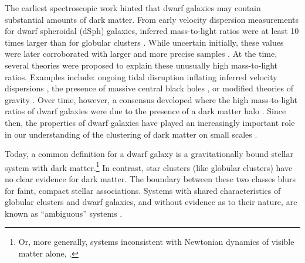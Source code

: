 The earliest spectroscopic work hinted that dwarf galaxies may contain
substantial amounts of dark matter. From early velocity dispersion
measurements for dwarf spheroidal (dSph) galaxies, inferred
mass-to-light ratios were at least 10 times larger than for globular
clusters \citep[e.g.,][]{aaronson1983, aaronson+olszewski1987}. While
uncertain initially, these values were later corroborated with larger
and more precise samples \citep[e.g.,][]{hargreaves+1994}. At the time,
several theories were proposed to explain these unusually high
mass-to-light ratios. Examples include: ongoing tidal disruption
inflating inferred velocity dispersions
\citep[e.g.,][]{kuhn+miller1989}, the presence of massive central black
holes \citep[e.g.,][]{strobel+lake1994}, or modified theories of gravity
\citep{milgrom1995}. Over time, however, a consensus developed where the
high mass-to-light ratios of dwarf galaxies were due to the presence of
a dark matter halo \citep[e.g.,][]{dekel+silk1986, wechsler+tinker2018}.
Since then, the properties of dwarf galaxies have played an increasingly
important role in our understanding of the clustering of dark matter on
small scales \citep[e.g.,][]{bullock+boylan-kolchin2017, sales+2022}.

Today, a common definition for a dwarf galaxy is a gravitationally bound
stellar system with dark matter.\footnote{Or, more generally, systems
  inconsistent with Newtonian dynamics of visible matter alone,
  \citet{willman+strader2012}.} In contrast, star clusters (like
globular clusters) have no clear evidence for dark matter. The boundary
between these two classes blurs for faint, compact stellar associations.
Systems with shared characteristics of globular clusters and dwarf
galaxies, and without evidence as to their nature, are known as
``ambiguous'' systems \citep[e.g.,][]{smith+2024}.

